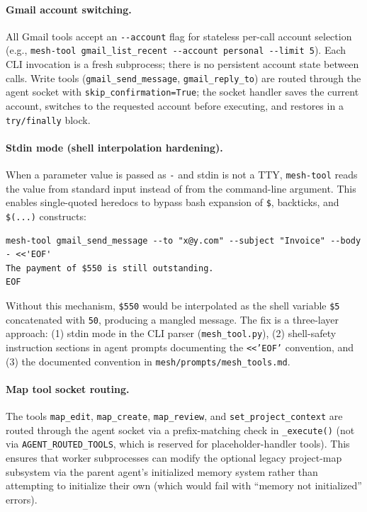 \documentclass[11pt,letterpaper]{report}
\newcommand{\code}[1]{\texttt{#1}}
\begin{document}
\paragraph{Gmail account switching.}
All Gmail tools accept an \code{-{}-account} flag for stateless
per-call account selection (e.g., \code{mesh-tool gmail\_list\_recent
-{}-account personal -{}-limit 5}). Each CLI invocation is a fresh
subprocess; there is no persistent account state between calls. Write
tools (\code{gmail\_send\_message}, \code{gmail\_reply\_to}) are routed
through the agent socket with \code{skip\_confirmation=True}; the socket
handler saves the current account, switches to the requested account
before executing, and restores in a \code{try/finally} block.

\paragraph{Stdin mode (shell interpolation hardening).}
When a parameter value is passed as \code{-} and stdin is not a TTY,
\code{mesh-tool} reads the value from standard input instead of from the
command-line argument. This enables single-quoted heredocs to bypass bash
expansion of \code{\$}, backticks, and \code{\$(...)} constructs:

\begin{lstlisting}[numbers=none]
mesh-tool gmail_send_message --to "x@y.com" --subject "Invoice" --body - <<'EOF'
The payment of $550 is still outstanding.
EOF
\end{lstlisting}

Without this mechanism, \code{\$550} would be interpolated as the shell
variable \code{\$5} concatenated with \code{50}, producing a mangled
message. The fix is a three-layer approach: (1) stdin mode in the CLI
parser (\code{mesh\_tool.py}), (2) shell-safety instruction sections in
agent prompts documenting the \code{<<'EOF'} convention, and (3) the
documented convention in \code{mesh/prompts/mesh\_tools.md}.

\paragraph{Map tool socket routing.}
The tools \code{map\_edit}, \code{map\_create}, \code{map\_review}, and
\code{set\_project\_context} are routed through the agent socket via a
prefix-matching check in \code{\_execute()} (not via
\code{AGENT\_ROUTED\_TOOLS}, which is reserved for placeholder-handler
tools). This ensures that worker subprocesses can modify the optional
legacy project-map subsystem via the parent agent's initialized memory system
rather than attempting to initialize their own (which would fail with
``memory not initialized'' errors).
\end{document}
